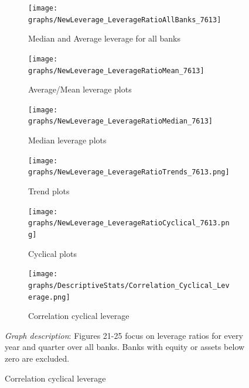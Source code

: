 \documentclass[12pt, a4paper]{article} %
\begin{document}
\begin{figure}[hbtp]
\begin{figure}[hbtp]
\centering
\caption{Median and Average leverage for all banks}
\texttt{[image: graphs/NewLeverage\_LeverageRatioAllBanks\_7613]}
\end{figure}

\newpage

\begin{figure}[hbtp]
\centering
\caption{Average/Mean leverage plots}
\texttt{[image: graphs/NewLeverage\_LeverageRatioMean\_7613]}
\end{figure}


\begin{figure}[hbtp]
\centering
\caption{Median leverage plots}
\texttt{[image: graphs/NewLeverage\_LeverageRatioMedian\_7613]}
\end{figure}

\newpage

\begin{figure}[hbtp]
\centering
\caption{Trend plots}
\texttt{[image: graphs/NewLeverage\_LeverageRatioTrends\_7613.png]}
\end{figure}


\begin{figure}[hbtp]
\centering
\caption{Cyclical plots}
\texttt{[image: graphs/NewLeverage\_LeverageRatioCyclical\_7613.png]}
\end{figure}

\newpage

\begin{figure}[hbtp]
\centering
\caption{Correlation cyclical leverage}
\texttt{[image: graphs/DescriptiveStats/Correlation\_Cyclical\_Leverage.png]}
\end{figure}

\noindent \textit{Graph description}: Figures 21-25 focus on leverage ratios for every year and quarter over all banks. Banks with equity or assets below zero are excluded.



\end{figure}
\end{document}
